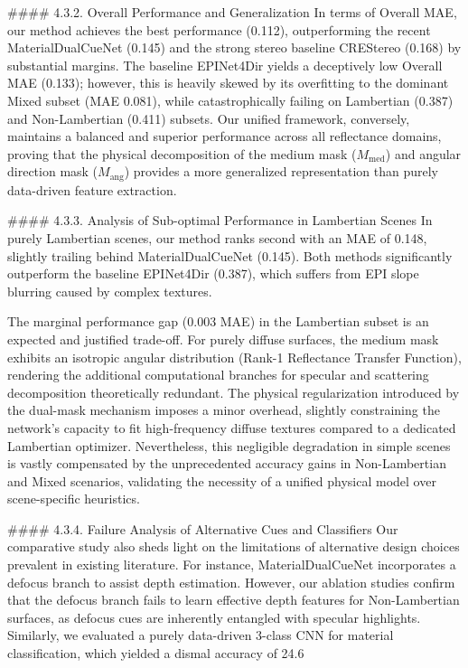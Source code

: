 \#\#\#\# 4.3.2. Overall Performance and Generalization
In terms of Overall MAE, our method achieves the best performance (0.112), outperforming the recent MaterialDualCueNet (0.145) and the strong stereo baseline CREStereo (0.168) by substantial margins. The baseline EPINet4Dir yields a deceptively low Overall MAE (0.133); however, this is heavily skewed by its overfitting to the dominant Mixed subset (MAE 0.081), while catastrophically failing on Lambertian (0.387) and Non-Lambertian (0.411) subsets. Our unified framework, conversely, maintains a balanced and superior performance across all reflectance domains, proving that the physical decomposition of the medium mask ($M_{\text{med}}$) and angular direction mask ($M_{\text{ang}}$) provides a more generalized representation than purely data-driven feature extraction.

\#\#\#\# 4.3.3. Analysis of Sub-optimal Performance in Lambertian Scenes
In purely Lambertian scenes, our method ranks second with an MAE of 0.148, slightly trailing behind MaterialDualCueNet (0.145). Both methods significantly outperform the baseline EPINet4Dir (0.387), which suffers from EPI slope blurring caused by complex textures. 

The marginal performance gap (0.003 MAE) in the Lambertian subset is an expected and justified trade-off. For purely diffuse surfaces, the medium mask exhibits an isotropic angular distribution (Rank-1 Reflectance Transfer Function), rendering the additional computational branches for specular and scattering decomposition theoretically redundant. The physical regularization introduced by the dual-mask mechanism imposes a minor overhead, slightly constraining the network's capacity to fit high-frequency diffuse textures compared to a dedicated Lambertian optimizer. Nevertheless, this negligible degradation in simple scenes is vastly compensated by the unprecedented accuracy gains in Non-Lambertian and Mixed scenarios, validating the necessity of a unified physical model over scene-specific heuristics.

\#\#\#\# 4.3.4. Failure Analysis of Alternative Cues and Classifiers
Our comparative study also sheds light on the limitations of alternative design choices prevalent in existing literature. For instance, MaterialDualCueNet incorporates a defocus branch to assist depth estimation. However, our ablation studies confirm that the defocus branch fails to learn effective depth features for Non-Lambertian surfaces, as defocus cues are inherently entangled with specular highlights. Similarly, we evaluated a purely data-driven 3-class CNN for material classification, which yielded a dismal accuracy of 24.6\\%

